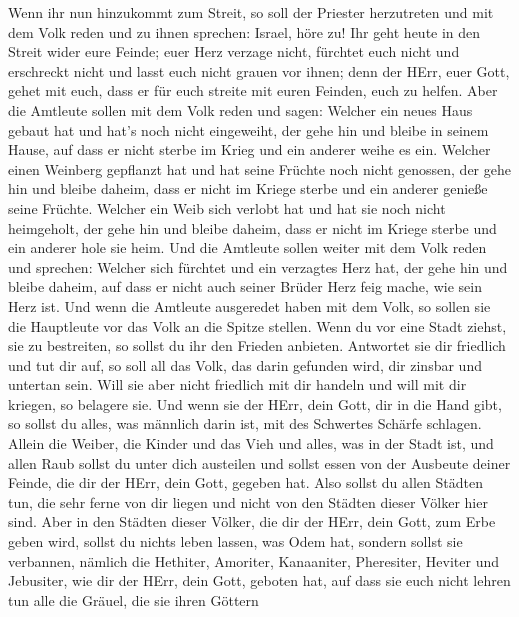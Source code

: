  Wenn ihr nun hinzukommt zum Streit, so soll der Priester
herzutreten und mit dem Volk reden  und zu ihnen sprechen:
Israel, höre zu! Ihr geht heute in den Streit wider eure Feinde; euer
Herz verzage nicht, fürchtet euch nicht und erschreckt nicht und lasst
euch nicht grauen vor ihnen;  denn der HErr, euer Gott,
gehet mit euch, dass er für euch streite mit euren Feinden, euch zu
helfen.  Aber die Amtleute sollen mit dem Volk reden und
sagen: Welcher ein neues Haus gebaut hat und hat's noch nicht
eingeweiht, der gehe hin und bleibe in seinem Hause, auf dass er nicht
sterbe im Krieg und ein anderer weihe es ein.  Welcher einen
Weinberg gepflanzt hat und hat seine Früchte noch nicht genossen, der
gehe hin und bleibe daheim, dass er nicht im Kriege sterbe und ein
anderer genieße seine Früchte.  Welcher ein Weib sich
verlobt hat und hat sie noch nicht heimgeholt, der gehe hin und bleibe
daheim, dass er nicht im Kriege sterbe und ein anderer hole sie heim.
 Und die Amtleute sollen weiter mit dem Volk reden und
sprechen: Welcher sich fürchtet und ein verzagtes Herz hat, der gehe hin
und bleibe daheim, auf dass er nicht auch seiner Brüder Herz feig mache,
wie sein Herz ist.  Und wenn die Amtleute ausgeredet haben
mit dem Volk, so sollen sie die Hauptleute vor das Volk an die Spitze
stellen.  Wenn du vor eine Stadt ziehst, sie zu bestreiten,
so sollst du ihr den Frieden anbieten.  Antwortet sie dir
friedlich und tut dir auf, so soll all das Volk, das darin gefunden
wird, dir zinsbar und untertan sein.  Will sie aber nicht
friedlich mit dir handeln und will mit dir kriegen, so belagere sie.
 Und wenn sie der HErr, dein Gott, dir in die Hand gibt, so
sollst du alles, was männlich darin ist, mit des Schwertes Schärfe
schlagen.  Allein die Weiber, die Kinder und das Vieh und
alles, was in der Stadt ist, und allen Raub sollst du unter dich
austeilen und sollst essen von der Ausbeute deiner Feinde, die dir der
HErr, dein Gott, gegeben hat.  Also sollst du allen Städten
tun, die sehr ferne von dir liegen und nicht von den Städten dieser
Völker hier sind.  Aber in den Städten dieser Völker, die
dir der HErr, dein Gott, zum Erbe geben wird, sollst du nichts leben
lassen, was Odem hat,  sondern sollst sie verbannen,
nämlich die Hethiter, Amoriter, Kanaaniter, Pheresiter, Heviter und
Jebusiter, wie dir der HErr, dein Gott, geboten hat,  auf
dass sie euch nicht lehren tun alle die Gräuel, die sie ihren Göttern
